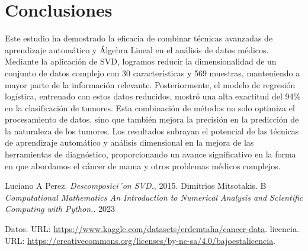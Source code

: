 \documentclass[a4paper,10pt,twocolumn]{article}
\begin{document}
\section{Conclusiones}
Este estudio ha demostrado la eficacia de combinar técnicas avanzadas de aprendizaje automático y Álgebra Lineal en el análisis de datos médicos. Mediante la aplicación de SVD, logramos reducir la dimensionalidad de un conjunto de datos complejo con 30 características y 569 muestras, manteniendo a mayor parte de la información relevante. Posteriormente, el modelo de regresión logística, entrenado con estos datos reducidos, mostró una alta exactitud del 94\% en la clasificación de tumores. Esta combinación de métodos no solo optimiza el procesamiento de datos, sino que también mejora la precisión en la predicción de la naturaleza de los tumores. Los resultados subrayan el potencial de las técnicas de aprendizaje automático y análisis dimensional en la mejora de las herramientas de diagnóstico, proporcionando un avance significativo en la forma en que abordamos el cáncer de mama y otros problemas médicos complejos.
	
		
	





\begin{thebibliography}{99}
	 Luciano A Perez. \emph{Descomposici´on SVD.}, 2015.
	 Dimitrios Mitsotakis. B \emph{Computational Mathematics An Introduction to Numerical Analysis and Scientific Computing with Python.}. 2023

	 Datos. URL: \href{https://www.kaggle.com/datasets/erdemtaha/cancer-data}
{https://www.kaggle.com/datasets/erdemtaha/cancer-data}.
 licencia. URL: \href{https://creativecommons.org/licenses/by-nc-sa/4.0/bajoestalicencia}
{https://creativecommons.org/licenses/by-nc-sa/4.0/bajoestalicencia}.
\end{thebibliography}


\label{end}
\end{document}
